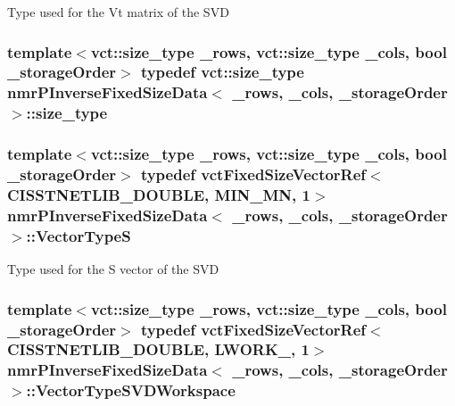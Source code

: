 Type used for the Vt matrix of the S\-V\-D \hypertarget{classnmr_p_inverse_fixed_size_data_a10ebf99e82bb3dd2afd42fc723fac07b}{
\subsubsection[{size\-\_\-type}]{\setlength{\rightskip}{0pt plus 5cm}template$<$vct\-::size\-\_\-type \-\_\-rows, vct\-::size\-\_\-type \-\_\-cols, bool \-\_\-storage\-Order$>$ typedef {\bf vct\-::size\-\_\-type} {\bf nmr\-P\-Inverse\-Fixed\-Size\-Data}$<$ \-\_\-rows, \-\_\-cols, \-\_\-storage\-Order $>$\-::{\bf size\-\_\-type}}}\label{classnmr_p_inverse_fixed_size_data_a10ebf99e82bb3dd2afd42fc723fac07b}
\hypertarget{classnmr_p_inverse_fixed_size_data_a55ba424dddf7bd0797b80bc468a209b0}{
\subsubsection[{Vector\-Type\-S}]{\setlength{\rightskip}{0pt plus 5cm}template$<$vct\-::size\-\_\-type \-\_\-rows, vct\-::size\-\_\-type \-\_\-cols, bool \-\_\-storage\-Order$>$ typedef {\bf vct\-Fixed\-Size\-Vector\-Ref}$<$C\-I\-S\-S\-T\-N\-E\-T\-L\-I\-B\-\_\-\-D\-O\-U\-B\-L\-E, {\bf M\-I\-N\-\_\-\-M\-N}, 1$>$ {\bf nmr\-P\-Inverse\-Fixed\-Size\-Data}$<$ \-\_\-rows, \-\_\-cols, \-\_\-storage\-Order $>$\-::{\bf Vector\-Type\-S}}}\label{classnmr_p_inverse_fixed_size_data_a55ba424dddf7bd0797b80bc468a209b0}
Type used for the S vector of the S\-V\-D \hypertarget{classnmr_p_inverse_fixed_size_data_aedbceacb820ab99ce724431b6f38d56e}{
\subsubsection[{Vector\-Type\-S\-V\-D\-Workspace}]{\setlength{\rightskip}{0pt plus 5cm}template$<$vct\-::size\-\_\-type \-\_\-rows, vct\-::size\-\_\-type \-\_\-cols, bool \-\_\-storage\-Order$>$ typedef {\bf vct\-Fixed\-Size\-Vector\-Ref}$<$C\-I\-S\-S\-T\-N\-E\-T\-L\-I\-B\-\_\-\-D\-O\-U\-B\-L\-E, {\bf L\-W\-O\-R\-K\-\_}, 1$>$ {\bf nmr\-P\-Inverse\-Fixed\-Size\-Data}$<$ \-\_\-rows, \-\_\-cols, \-\_\-storage\-Order $>$\-::{\bf Vector\-Type\-S\-V\-D\-Workspace}}}\label{classnmr_p_inverse_fixed_size_data_aedbceacb820ab99ce724431b6f38d56e}

